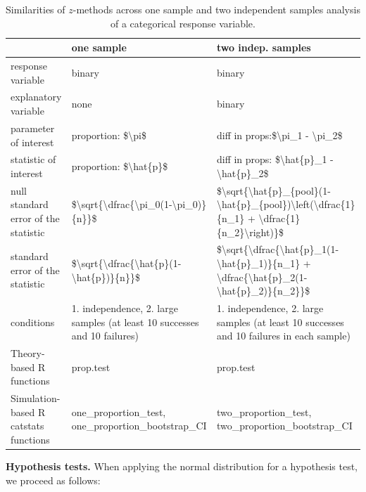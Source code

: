 \documentclass[
  10pt,
  openany]{book}
\theoremstyle{definition}
\theoremstyle{definition}
\theoremstyle{definition}
\theoremstyle{definition}
\theoremstyle{remark}
\begin{document}
\begin{table}
\centering
\caption{\label{tab:zcompare}Similarities of $z$-methods across one sample and two independent samples analysis of a categorical response variable.}
\centering
\begin{tabular}[t]{l|l|l}
\hline
 &  one sample  & two indep. samples\\
\hline
response variable & binary & binary\\
\hline
explanatory variable & none & binary\\
\hline
parameter of interest & proportion: \$\textbackslash{}pi\$ & diff in props:\$\textbackslash{}pi\_1 - \textbackslash{}pi\_2\$\\
\hline
statistic of interest & proportion: \$\textbackslash{}hat\{p\}\$ & diff in props: \$\textbackslash{}hat\{p\}\_1 - \textbackslash{}hat\{p\}\_2\$\\
\hline
null standard error of the statistic & \$\textbackslash{}sqrt\{\textbackslash{}dfrac\{\textbackslash{}pi\_0(1-\textbackslash{}pi\_0)\}\{n\}\}\$ & \$\textbackslash{}sqrt\{\textbackslash{}hat\{p\}\_\{pool\}(1-\textbackslash{}hat\{p\}\_\{pool\})\textbackslash{}left(\textbackslash{}dfrac\{1\}\{n\_1\} + \textbackslash{}dfrac\{1\}\{n\_2\}\textbackslash{}right)\}\$\\
\hline
standard error of the statistic & \$\textbackslash{}sqrt\{\textbackslash{}dfrac\{\textbackslash{}hat\{p\}(1-\textbackslash{}hat\{p\})\}\{n\}\}\$ & \$\textbackslash{}sqrt\{\textbackslash{}dfrac\{\textbackslash{}hat\{p\}\_1(1-\textbackslash{}hat\{p\}\_1)\}\{n\_1\} + \textbackslash{}dfrac\{\textbackslash{}hat\{p\}\_2(1-\textbackslash{}hat\{p\}\_2)\}\{n\_2\}\}\$\\
\hline
conditions & 1. independence, 2. large samples (at least 10 successes and 10 failures) & 1. independence, 2. large samples (at least 10 successes and 10 failures in each sample)\\
\hline
Theory-based R functions & prop.test & prop.test\\
\hline
Simulation-based R catstats functions & one\_proportion\_test, one\_proportion\_bootstrap\_CI & two\_proportion\_test, two\_proportion\_bootstrap\_CI\\
\hline
\end{tabular}
\end{table}

\textbf{Hypothesis tests.} When applying the normal distribution for a hypothesis test, we proceed as follows:
\end{document}
